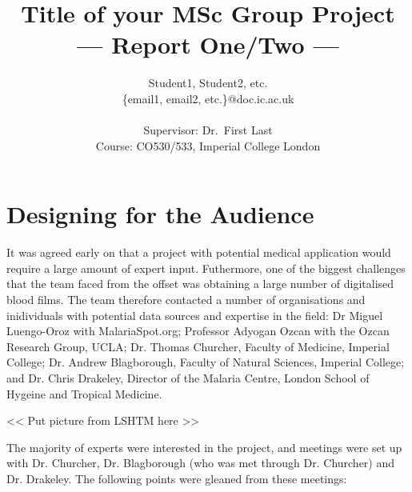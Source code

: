 \documentclass[a4paper,11pt]{article}
\title{Title of your MSc Group Project\\\Large{--- Report One/Two ---}}
\author{Student1, Student2, etc.\\
       \{email1, email2, etc.\}@doc.ic.ac.uk\\ \\
      \small{Supervisor: Dr.\ First Last}\\
     \small{Course: CO530/533, Imperial College London}
}
\begin{document}
\section{Designing for the Audience}
It was agreed early on that a project with potential medical application would require a large amount of expert input. Futhermore, one of the biggest challenges that the team faced from the offset was obtaining a large number of digitalised blood films. The team therefore contacted a number of organisations and inidividuals with potential data sources and expertise in the field: Dr Miguel Luengo-Oroz with MalariaSpot.org; Professor Adyogan Ozcan with the Ozcan Research Group, UCLA; Dr. Thomas Churcher, Faculty of Medicine, Imperial College; Dr. Andrew Blagborough, Faculty of Natural Sciences, Imperial College; and Dr. Chris Drakeley, Director of the Malaria Centre, London School of Hygeine and Tropical Medicine. 

<< Put picture from LSHTM here >>

The majority of experts were interested in the project, and meetings were set up with Dr. Churcher, Dr. Blagborough (who was met through Dr. Churcher) and Dr. Drakeley. The following points were gleaned from these meetings:
\end{document}
